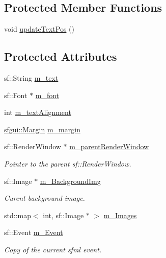 \subsection*{Protected Member Functions}
\begin{CompactItemize}
\item 
void \hyperlink{classsfgui_1_1Object_27d9eb8b653f263f76b612cd77512321}{updateTextPos} ()
\end{CompactItemize}
\subsection*{Protected Attributes}
\begin{CompactItemize}
\item 
sf::String \hyperlink{classsfgui_1_1Object_b63c033215c2f6f1d64645e3c6f0153b}{m\_\-text}
\item 
sf::Font $\ast$ \hyperlink{classsfgui_1_1Object_20ec4624e3d9b8e3cebeb71ec97fd104}{m\_\-font}
\item 
int \hyperlink{classsfgui_1_1Object_7cfb56995f2140319df705fb1b146d36}{m\_\-textAlignment}
\item 
\hyperlink{structsfgui_1_1Margin}{sfgui::Margin} \hyperlink{classsfgui_1_1Object_b7afeee103f0cfc0c045effa8527a4b4}{m\_\-margin}
\item 
sf::RenderWindow $\ast$ \hyperlink{classsfgui_1_1Object_518ad23f1c9aab6fd9b346d708c503a8}{m\_\-parentRenderWindow}
\begin{CompactList}\small\item\em Pointer to the parent sf::RenderWindow. \item\end{CompactList}\item 
sf::Image $\ast$ \hyperlink{classsfgui_1_1Object_08225eee55352c02435d14e1bce24dbe}{m\_\-BackgroundImg}
\begin{CompactList}\small\item\em Curent background image. \item\end{CompactList}\item 
std::map$<$ int, sf::Image $\ast$ $>$ \hyperlink{classsfgui_1_1Object_6d7907f767742dcfd37c1b0c349daa2d}{m\_\-Images}
\item 
sf::Event \hyperlink{classsfgui_1_1Object_bd45c91f926c930806870ce8acbb955e}{m\_\-Event}
\begin{CompactList}\small\item\em Copy of the current sfml event. \item\end{CompactList}\end{CompactItemize}
